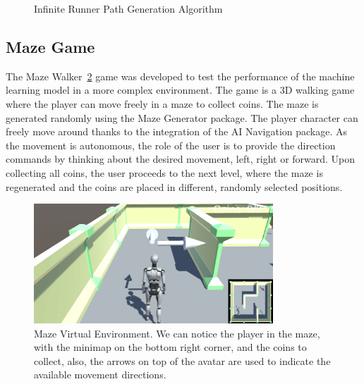 \begin{figure}[!htbp]
{
    }
    \caption{Infinite Runner Path Generation Algorithm}\label{fig:infinite_runner_path_generation}
\end{figure}

\subsection*{Maze Game}
The Maze Walker~\ref{fig:maze} game was developed to test the performance of the machine learning model in a more complex environment.
The game is a 3D walking game where the player can move freely in a maze to collect coins.
The maze is generated randomly using the Maze Generator package.
The player character can freely move around thanks to the integration of the AI Navigation package.
As the movement is autonomous, the role of the user is to provide the direction commands by thinking about the desired movement, left, right or forward.
Upon collecting all coins, the user proceeds to the next level, where the maze is regenerated and the coins are placed in different, randomly selected positions.

\begin{figure}[!htbp]
    \centering
    \includegraphics[width=0.8\textwidth]{Figures/Methodology/maze}
    \caption{Maze Virtual Environment. We can notice the player in the maze, with the minimap on the bottom right corner, and the coins to collect, also, the arrows on top of the avatar are used to indicate the available movement directions.}\label{fig:maze}
\end{figure}